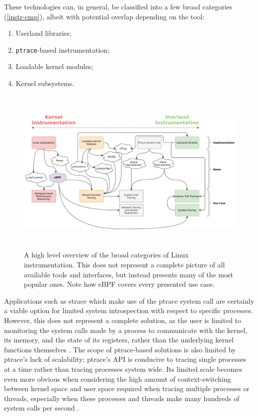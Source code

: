 \documentclass[
  12pt]{findlay}
\newcommand{\passthrough}[1]{#1}
\providecommand{\tightlist}{\setlength{\itemsep}{0pt}\setlength{\parskip}{0pt}}
\begin{document}
\clearpage

These technologies can, in general, be classified into a few broad
categories (\autoref{instr-cmp}), albeit with potential overlap
depending on the tool:

\begin{enumerate}
\def\labelenumi{\arabic{enumi})}
\tightlist
\item
  Userland libraries;
\item
  \passthrough{\lstinline!ptrace!}-based instrumentation;
\item
  Loadable kernel modules;
\item
  Kernel subsystems.
\end{enumerate}

\begin{figure}
\begin{center}
\includegraphics[keepaspectratio, height=3.2in]{../figures/instr-cmp.png}
\end{center}
\caption[A high level overview of the broad categories of Linux instrumentation]{
A high level overview of the broad categories of Linux instrumentation.
This does not represent a complete picture of all available tools and interfaces,
but instead presents many of the most popular ones. Note how eBPF covers every presented use case.
}
\label{instr-cmp}
\end{figure}

Applications such as strace \autocite{strace,manstrace} which make use
of the ptrace system call are certainly a viable option for limited
system introspection with respect to specific processes. However, this
does not represent a complete solution, as the user is limited to
monitoring the system calls made by a process to communicate with the
kernel, its memory, and the state of its registers, rather than the
underlying kernel functions themselves \autocite{manptrace}. The scope
of ptrace-based solutions is also limited by ptrace's lack of
scalability; ptrace's API is conducive to tracing single processes at a
time rather than tracing processes system wide. Its limited scale
becomes even more obvious when considering the high amount of
context-switching between kernel space and user space required when
tracing multiple processes or threads, especially when these processes
and threads make many hundreds of system calls per second
\autocite{keniston07}.
\end{document}
